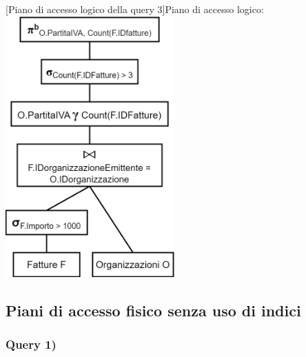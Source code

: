 \documentclass[a4paper,12pt]{article}
\begin{document}
\begin{minipage}{\textwidth}
\begin{multicols}{2}

\null \vfill

\vfill \null

\columnbreak

 [Piano di accesso logico della query 3]{Piano di accesso logico:}
\includegraphics[height=10cm]{ Albero logico 3.png }
\end{multicols}
\end{minipage}

 \subsection{ Piani di accesso fisico senza uso di indici }

 \subsubsection{ Query 1) }
\end{document}
